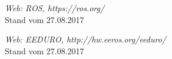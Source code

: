 \begin{thebibliography}{VP}
 \emph{Web: ROS, https://ros.org/}
\\Stand vom 27.08.2017

 \emph{Web: EEDURO, http://hw.eeros.org/eeduro/}
\\Stand vom 27.08.2017



\end{thebibliography}